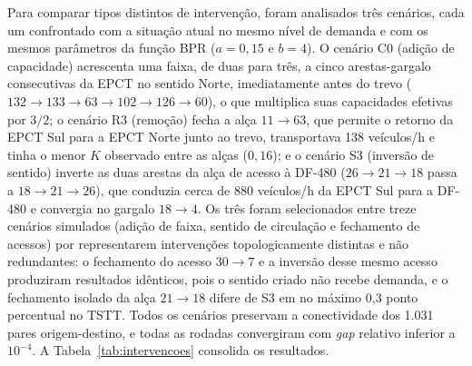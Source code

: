 \documentclass[portuguese]{sbc2025}%
\begin{document}
\begin{table}[htbp]
\caption{Indicadores Macro do Sistema}
\label{tab:indicadores_base}
\centering
{}
\end{table}

Para comparar tipos distintos de intervenção, foram analisados três cenários, cada um confrontado com a situação atual no mesmo nível de demanda e com os mesmos parâmetros da função BPR ($a=0{,}15$ e $b=4$). O cenário C0 (adição de capacidade) acrescenta uma faixa, de duas para três, a cinco arestas-gargalo consecutivas da EPCT no sentido Norte, imediatamente antes do trevo ($132\rightarrow133\rightarrow63\rightarrow102\rightarrow126\rightarrow60$), o que multiplica suas capacidades efetivas por $3/2$; o cenário R3 (remoção) fecha a alça $11\rightarrow63$, que permite o retorno da EPCT Sul para a EPCT Norte junto ao trevo, transportava 138 veículos/h e tinha o menor $K$ observado entre as alças ($0{,}16$); e o cenário S3 (inversão de sentido) inverte as duas arestas da alça de acesso à DF-480 ($26\rightarrow21\rightarrow18$ passa a $18\rightarrow21\rightarrow26$), que conduzia cerca de 880 veículos/h da EPCT Sul para a DF-480 e convergia no gargalo $18\rightarrow4$. Os três foram selecionados entre treze cenários simulados (adição de faixa, sentido de circulação e fechamento de acessos) por representarem intervenções topologicamente distintas e não redundantes: o fechamento do acesso $30\rightarrow7$ e a inversão desse mesmo acesso produziram resultados idênticos, pois o sentido criado não recebe demanda, e o fechamento isolado da alça $21\rightarrow18$ difere de S3 em no máximo 0,3 ponto percentual no TSTT. Todos os cenários preservam a conectividade dos 1.031 pares origem-destino, e todas as rodadas convergiram com \textit{gap} relativo inferior a $10^{-4}$. A Tabela~\ref{tab:intervencoes} consolida os resultados.
\end{document}
